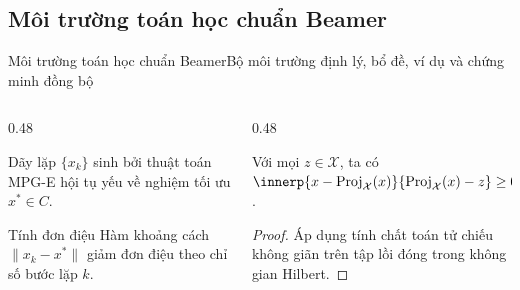 \documentclass[aspectratio=169,10pt]{beamer}
\begin{document}
\subsection{Môi trường toán học chuẩn Beamer}
\begin{frame}{Môi trường toán học chuẩn Beamer}{Bộ môi trường định lý, bổ đề, ví dụ và chứng minh đồng bộ}
  \scriptsize
  \begin{columns}[T]
    \begin{column}{0.48\textwidth}
      \begin{theorem}
        Dãy lặp $\{x_k\}$ sinh bởi thuật toán MPG-E hội tụ yếu về nghiệm tối ưu $x^* \in C$.
      \end{theorem}
      \vskip 2pt
      \begin{exampleblock}{Tính đơn điệu}
        Hàm khoảng cách $\|x_k - x^*\|$ giảm đơn điệu theo chỉ số bước lặp $k$.
      \end{exampleblock}
    \end{column}

    \begin{column}{0.48\textwidth}
      \begin{lemma}
        Với mọi $z \in \mathcal{X}$, ta có $\innerp{x - \mathrm{Proj}_{\mathcal{X}}(x)}{\mathrm{Proj}_{\mathcal{X}}(x) - z} \ge 0$.
      \end{lemma}
      \vskip 2pt
      \begin{proof}
        Áp dụng tính chất toán tử chiếu không giãn trên tập lồi đóng trong không gian Hilbert.
      \end{proof}
    \end{column}
  \end{columns}
\end{frame}
\end{document}
